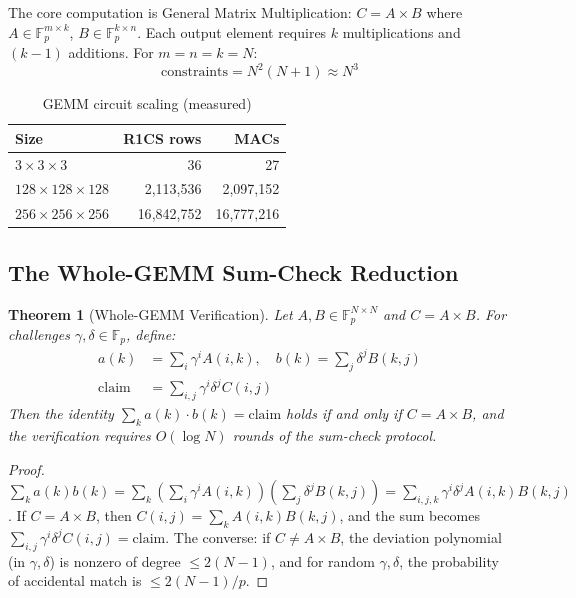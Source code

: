 \documentclass[11pt, a4paper]{article}
\newtheorem{theorem}{Theorem}
\begin{document}
The core computation is General Matrix Multiplication: $C = A \times B$ where $A \in \mathbb{F}_p^{m \times k}$, $B \in \mathbb{F}_p^{k \times n}$. Each output element requires $k$ multiplications and $(k-1)$ additions. For $m = n = k = N$:
\begin{equation}
\text{constraints} = N^2(N+1) \approx N^3
\end{equation}

\begin{table}[h]
\centering
\caption{GEMM circuit scaling (measured)}
\begin{tabular}{lrr}
\toprule
\textbf{Size} & \textbf{R1CS rows} & \textbf{MACs} \\
\midrule
 $3 \times 3 \times 3$ & 36 & 27 \\
 $128 \times 128 \times 128$ & 2{,}113{,}536 & 2{,}097{,}152 \\
 $256 \times 256 \times 256$ & 16{,}842{,}752 & 16{,}777{,}216 \\
\bottomrule
\end{tabular}
\end{table}

\subsection{The Whole-GEMM Sum-Check Reduction}

\begin{theorem}[Whole-GEMM Verification]
\label{thm:whole-gemm}
Let $A, B \in \mathbb{F}_p^{N \times N}$ and $C = A \times B$. For challenges $\gamma, \delta \in \mathbb{F}_p$, define:
\begin{align}
a(k) &= \textstyle\sum_i \gamma^i A(i,k), \quad b(k) = \sum_j \delta^j B(k,j) \\
\text{claim} &= \textstyle\sum_{i,j} \gamma^i \delta^j C(i,j)
\end{align}
Then the identity $\sum_k a(k) \cdot b(k) = \text{claim}$ holds if and only if $C = A \times B$, and the verification requires $O(\log N)$ rounds of the sum-check protocol.
\end{theorem}

\begin{proof}
 $\sum_k a(k) b(k) = \sum_k \left(\sum_i \gamma^i A(i,k)\right)\left(\sum_j \delta^j B(k,j)\right) = \sum_{i,j,k} \gamma^i \delta^j A(i,k) B(k,j)$. If $C = A \times B$, then $C(i,j) = \sum_k A(i,k) B(k,j)$, and the sum becomes $\sum_{i,j} \gamma^i \delta^j C(i,j) = \text{claim}$. The converse: if $C \neq A \times B$, the deviation polynomial (in $\gamma, \delta$) is nonzero of degree $\le 2(N-1)$, and for random $\gamma, \delta$, the probability of accidental match is $\le 2(N-1)/p$.
\end{proof}
\end{document}
